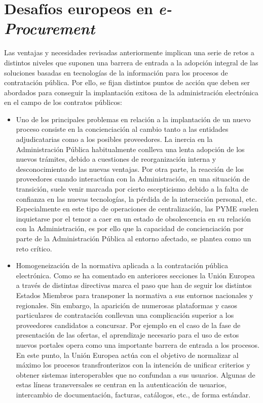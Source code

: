\section{Desafíos europeos en \textit{e-Procurement}}
Las ventajas y necesidades revisadas anteriormente implican una serie de retos a distintos
niveles que suponen una barrera de entrada a la adopción integral de las soluciones basadas
en tecnologías de la información para los procesos de contratación pública. Por ello,
se fijan distintos puntos de acción que deben ser abordados para conseguir la implantación
exitosa de la administración electrónica en el campo de los contratos públicos:

\begin{itemize}
 \item Uno de los principales problemas en relación a la implantación de un nuevo proceso consiste en la 
concienciación al cambio tanto a las entidades adjudicatarias como a los posibles proveedores. La inercia
en la Administración Pública habitualmente conlleva una lenta adopción de los nuevos trámites, debido
a cuestiones de reorganización interna y desconocimiento de las nuevas ventajas. Por otra parte, 
la reacción de los proveedores cuando interactúan con la Administración, en una situación de transición, 
suele venir marcada por cierto escepticismo debido a la falta de confianza
en las nuevas tecnologías, la pérdida de la interacción personal, etc. Especialmente en este
tipo de operaciones de centralización, las \gls{PYME} suelen inquietarse por el temor a caer en un 
estado de obsolescencia en su relación con la Administración, es por ello que la
capacidad de concienciación por parte de la Administración Pública al entorno afectado, se plantea
como un reto crítico.

\item Homogeneización de la normativa aplicada a la contratación pública electrónica. Como
se ha comentado en anteriores secciones la Unión \gls{Europea} a través de distintas directivas
marca el paso que han de seguir los distintos \gls{Estados} Miembros para transponer la normativa
a sus entornos nacionales y regionales. Sin embargo, la aparición de numerosas plataformas
y casos particulares de contratación conllevan una complicación superior a los proveedores
candidatos a concursar. Por ejemplo en el caso de la fase de presentación de las ofertas, 
el aprendizaje necesario para el uso de estos nuevos portales opera como una importante
barrera de entrada a los procesos. En este punto, la Unión Europea actúa con el objetivo
de normalizar al máximo los procesos transfronterizos con la intención de unificar criterios
y obtener sistemas interoperables que no confundan a sus usuarios. Algunas de estas líneas
transversales se centran en la autenticación de usuarios, intercambio de documentación,
facturas, catálogos, etc., de forma estándar.


\end{itemize}
